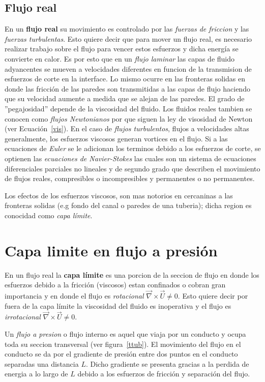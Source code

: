 \documentclass[10pt, oneside]{article}
\begin{document}
\subsection{Flujo real}
En un \textbf{flujo real} su movimiento es controlado por las \emph{fuerzas de friccion} y las \emph{fuerzas turbulentas}. Esto quiere decir que para mover un flujo real, es necesario realizar trabajo sobre el flujo para vencer estos esfuerzos y dicha energ\'ia se convierte en calor. Es por esto que en un \emph{flujo laminar} las capas de fluido adyancentes se mueven a velocidades diferentes en funcion de la transmision de esfuerzos de corte en la interface. Lo mismo ocurre en las fronteras solidas en donde las fricci\'on de las paredes son transmitidas a las capas de flujo haciendo que su velocidad aumente a medida que se alejan de las paredes. El grado de ''pegajosidad'' depende de la viscosidad del fluido. Los fluidos reales tambien se conocen como \emph{flujos Newtonianos} por que siguen la ley de visosidad de Newton (ver Ecuaci\'on~\ref{vis}).
En el caso de \emph{flujos turbulentos}, flujos a velocidades altas generalmente, los esfuerzos viscosos generan vortices en el flujo. Si a las ecuaciones de \emph{Euler} se le adicionan los terminos debido a los esfuerzos de corte, se optienen las \emph{ecuaciones de Navier-Stokes} las cuales son un sistema de ecuaciones diferenciales parciales no lineales y de segundo grado que describen el movimiento de flujos reales, compresibles o incompresibles y permanentes o no permanentes. 

Los efectos de los esfuerzos viscosos, son mas notorios en cercaninas a las fronteras solidas (e.g fondo del canal o paredes de una tuberia); dicha region es conocidad como \emph{capa l\'imite}. 


\section{Capa limite en flujo a presi\'on}
En un flujo real  la \textbf{capa l\'imite} es una porcion de la seccion de flujo en donde los esfuerzos debido a la fricci\'on (viscosos) estan confinados o cobran gran importancia y en donde el flujo es \emph{rotacional} $\vec{\nabla} \times  \vec{U} \neq 0$. Esto quiere decir por fuera de la capa l\'imite la viscosidad del fluido es inoperativa y el flujo es \emph{irrotacional}  $\vec{\nabla} \times  \vec{U} \ne 0$.

Un \emph{flujo a presion} o flujo interno es aquel que viaja por un conducto y ocupa toda su seccion transversal (ver figura~\ref{ttub}). El movimiento del flujo en el conducto se da por el gradiente de presi\'on entre dos puntos en el conducto separadas una distancia $L$. Dicho gradiente se presenta gracias a la perdida de energia a lo largo de $L$ debido a los esfuerzos de fricci\'on y separaci\'on del flujo.  
\end{document}
